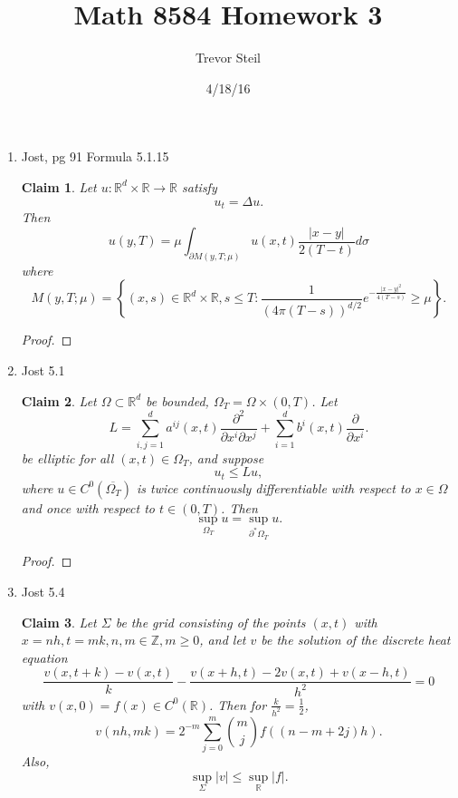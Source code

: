 \documentclass[a4paper]{article}
\title{Math 8584 Homework 3 }
\date{4/18/16}
\author{Trevor Steil}
\newtheorem*{claim}{Claim}
\newcommand{\R}{\mathbb{R}}
\newcommand{\Z}{\mathbb{Z}}
\begin{document}
\maketitle
\begin{enumerate}
  \item Jost, pg 91 Formula 5.1.15
    \begin{claim}
      Let $u: \R^d \times \R \to \R$ satisfy
      \begin{equation*}
        u_t = \Delta u.
      \end{equation*}
      Then
      \[ u(y,T) = \mu \int_{\partial M(y, T; \mu)}^{} u(x,t) \frac{|x-y|}{2(T-t)} d \sigma \]
      where
      \[ M(y,T; \mu) = \left\{ (x,s) \in \R^d \times \R, s \leq T : \frac{1}{(4 \pi (T-s))^{d/2}} e^{-\frac{|x-y|^2}{4(T-s)} } \geq \mu \right\} .\]
    \end{claim}

    \begin{proof}
    \end{proof}

  \item Jost 5.1
    \begin{claim}
      Let $\Omega \subset \R^d$ be bounded, $\Omega_T = \Omega \times (0,T)$. Let
      \[ L = \sum_{i,j=1}^d a^{ij}(x,t) \frac{\partial^2}{\partial x^i \partial x^j} + \sum_{i=1}^d b^i(x,t) \frac{\partial}{\partial x^i} .\]
      be elliptic for all $(x,t) \in \Omega_T$, and suppose
      \[ u_t \leq Lu, \]
      where $u \in C^0(\overline{\Omega_T})$ is twice continuously differentiable with respect to $x \in \Omega$ and once with respect to $t \in
      (0,T)$. Then
      \[ \sup_{\Omega_T} u = \sup_{\partial^\ast \Omega_T} u. \]
    \end{claim}

    \begin{proof}
    \end{proof}

  \item Jost 5.4
    \begin{claim}
      Let $\Sigma$ be the grid consisting of the points $(x,t)$ with $x = nh, t = mk, n,m \in \Z, m \geq 0$, and let $v$ be the solution of the
      discrete heat equation
      \[ \frac{v(x,t+k) - v(x,t)}{k} - \frac{v(x+h,t) - 2v(x,t) + v(x-h,t)}{h^2} = 0 \]
      with $v(x,0) = f(x) \in C^0(\R)$.
      Then for $\frac{k}{h^2} = \frac{1}{2}$,
      \[ v(nh, mk) = 2^{-m} \sum_{j=0}^m \binom{m}{j} f \left( (n - m + 2j)h \right) .\]
      Also,
      \[ \sup_{\Sigma} |v| \leq \sup_\R |f|. \]
    \end{claim}


\end{enumerate}
\end{document}
